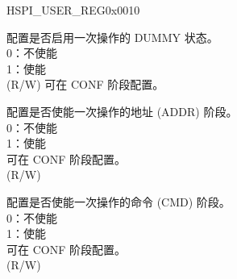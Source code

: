 \begin{register}{H}{SPI\_USER\_REG}{0x0010}
\begin{regdesc}
\begin{reglist}
\label{fielddesc:SPIUSRDUMMY}\item [SPI\_USR\_DUMMY] 配置是否启用一次操作的 DUMMY 状态。\\
0：不使能 \\
1：使能 \\
(R/W)
可在 CONF 阶段配置。\\

\label{fielddesc:SPIUSRADDR}\item [SPI\_USR\_ADDR] 配置是否使能一次操作的地址 (ADDR) 阶段。\\
0：不使能 \\
1：使能 \\
可在 CONF 阶段配置。 \\
(R/W)

\label{fielddesc:SPIUSRCOMMAND}\item [SPI\_USR\_COMMAND] 配置是否使能一次操作的命令 (CMD) 阶段。 \\
0：不使能 \\
1：使能 \\
可在 CONF 阶段配置。 \\
(R/W)
\end{reglist}\end{regdesc}
\end{register}



